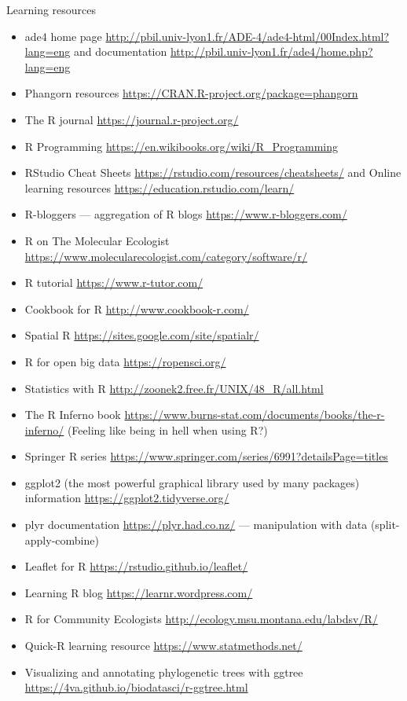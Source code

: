 \documentclass[compress, ucs, xelatex, 11pt, xcolor=svgnames, aspectratio=169,
	hyperref={
		bookmarks=true,
		unicode=true,
		colorlinks=true,
		pdftitle={Molecular data in R},
		plainpages=false,
		pdfauthor={Vojtech Zeisek},
		pdfsubject={Course about phylogeny and evolution in R},
		pdfcreator={XeLaTeX},
		pdfkeywords={R, evolution, phylogeny, molecular data},
		linkcolor=Crimson, %
		anchorcolor=Magenta, %
		citecolor=Magenta, %
		filecolor=Magenta, %
		menucolor=Magenta, %
		urlcolor=DodgerBlue, %
		pdftex},
	url={hyphens, lowtilde} %
	]{beamer}
\begin{document}
\begin{frame}[allowframebreaks]{Learning resources}
\begin{itemize}
		\item ade4 home page \url{http://pbil.univ-lyon1.fr/ADE-4/ade4-html/00Index.html?lang=eng} and documentation \url{http://pbil.univ-lyon1.fr/ade4/home.php?lang=eng}
		\item Phangorn resources \url{https://CRAN.R-project.org/package=phangorn}
		\item The R journal \url{https://journal.r-project.org/}
		\item R Programming \url{https://en.wikibooks.org/wiki/R_Programming}
		\item RStudio Cheat Sheets \url{https://rstudio.com/resources/cheatsheets/} and Online learning resources \url{https://education.rstudio.com/learn/}
		\item R-bloggers --- aggregation of R blogs \url{https://www.r-bloggers.com/}
		\item R on The Molecular Ecologist \url{https://www.molecularecologist.com/category/software/r/}
		\item R tutorial \url{https://www.r-tutor.com/}
		\item Cookbook for R  \url{http://www.cookbook-r.com/}
		\item Spatial R \url{https://sites.google.com/site/spatialr/}
		\item R for open big data \url{https://ropensci.org/}
		\item Statistics with R \url{http://zoonek2.free.fr/UNIX/48_R/all.html}
		\item The R Inferno book \url{https://www.burns-stat.com/documents/books/the-r-inferno/} (Feeling like being in hell when using R?)
		\item Springer R series \url{https://www.springer.com/series/6991?detailsPage=titles}
		\item ggplot2 (the most powerful graphical library used by many packages) information \url{https://ggplot2.tidyverse.org/}
		\item plyr documentation \url{https://plyr.had.co.nz/} --- manipulation with data (split-apply-combine)
		\item Leaflet for R \url{https://rstudio.github.io/leaflet/}
		\item Learning R blog \url{https://learnr.wordpress.com/}
		\item R for Community Ecologists \url{http://ecology.msu.montana.edu/labdsv/R/}
		\item Quick-R learning resource \url{https://www.statmethods.net/}
		\item Visualizing and annotating phylogenetic trees with ggtree \url{https://4va.github.io/biodatasci/r-ggtree.html}

\end{itemize}
\end{frame}
\end{document}

